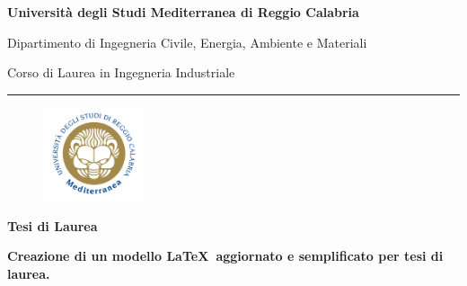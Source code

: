 \documentclass[envcountsame,envcountchap]{svmono}
\date{}
\begin{document}



\frontmatter

\begin{titlepage}

    \begin{center}

    \large{\bf Università degli Studi Mediterranea di Reggio Calabria}

    \vspace*{1mm}

    \large{Dipartimento di Ingegneria Civile, Energia, Ambiente e Materiali}

    \vspace*{1mm}

    \normalsize{Corso di Laurea in Ingegneria Industriale}

    \vspace*{1mm}

    \hspace*{-0mm}

    \rule{125mm}{.2mm}  %


    \vspace{18mm}

    \begin{figure}[h!]
        \centerline{\includegraphics[width=3cm]{logounirc.png}}
    \end{figure}

    \vspace{5mm}

    \textbf{Tesi di Laurea}

    \vspace{5mm}

    \large{\bf Creazione di un modello \LaTeX\ aggiornato e semplificato per tesi di laurea.}

    \vspace{22mm}


\end{center}
\end{titlepage}
\end{document}
